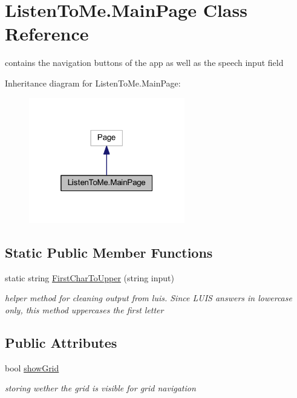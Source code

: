 \hypertarget{class_listen_to_me_1_1_main_page}{}\section{Listen\+To\+Me.\+Main\+Page Class Reference}
\label{class_listen_to_me_1_1_main_page}


contains the navigation buttons of the app as well as the speech input field  




Inheritance diagram for Listen\+To\+Me.\+Main\+Page\+:\nopagebreak
\begin{figure}[H]
\begin{center}
\leavevmode
\includegraphics[width=193pt]{class_listen_to_me_1_1_main_page__inherit__graph}
\end{center}
\end{figure}
\subsection*{Static Public Member Functions}
\begin{DoxyCompactItemize}
\item 
static string \hyperlink{class_listen_to_me_1_1_main_page_af4469348ffee9a5d1a8680d2535a279b}{First\+Char\+To\+Upper} (string input)
\begin{DoxyCompactList}\small\item\em helper method for cleaning output from luis. Since L\+U\+IS answers in lowercase only, this method uppercases the first letter \end{DoxyCompactList}\end{DoxyCompactItemize}
\subsection*{Public Attributes}
\begin{DoxyCompactItemize}
\item 
bool \hyperlink{class_listen_to_me_1_1_main_page_a03679610fded2c61480540ebcc7e4667}{show\+Grid}
\begin{DoxyCompactList}\small\item\em storing wether the grid is visible for grid navigation \end{DoxyCompactList}\end{DoxyCompactItemize}
